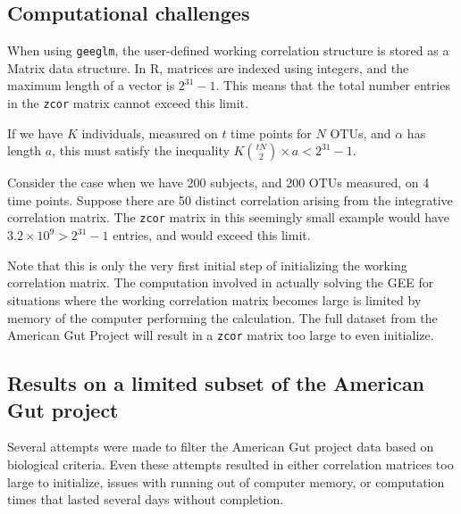 \documentclass[12pt]{article}
\begin{document}




\subsection{Computational challenges}

When using \texttt{geeglm}, the user-defined working correlation structure is stored as a Matrix data structure. In R, matrices are indexed using integers, and the maximum length of a vector is $2^{31}-1$. This means that the total number entries in the \texttt{zcor} matrix cannot exceed this limit.

If we have $K$ individuals, measured on $t$ time points for $N$ OTUs, and $\alpha$ has length $a$, this must satisfy the inequality $K \binom{tN}{2} \times a < 2^{31}-1$.

Consider the case when we have 200 subjects, and 200 OTUs measured, on 4 time points. Suppose there are 50 distinct correlation arising from the integrative correlation matrix. The \texttt{zcor} matrix in this seemingly small example would have $3.2 \times 10^9 > 2^{31}-1$ entries, and would exceed this limit.

Note that this is only the very first initial step of initializing the working correlation matrix. The computation involved in actually solving the GEE for situations where the working correlation matrix becomes large is limited by memory of the computer performing the calculation. The full dataset from the American Gut Project will result in a \texttt{zcor} matrix too large to even initialize.

\subsection{Results on a limited subset of the American Gut project}

Several attempts were made to filter the American Gut project data based on biological criteria. Even these attempts resulted in either correlation matrices too large to initialize, issues with running out of computer memory, or computation times that lasted several days without completion.
\end{document}

